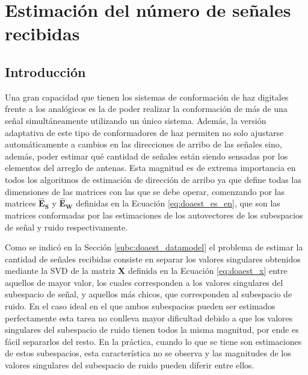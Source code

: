 \chapter{Estimación del número de señales recibidas}\label{ch:machinelearning}

\section{Introducción}\label{subc:intro_congen}
Una gran capacidad que tienen los sistemas de conformación de haz digitales frente a los analógicos es la de poder realizar la conformación de más de una señal simultáneamente utilizando un único sistema. Además, la versión adaptativa de este tipo de conformadores de haz permiten no solo ajustarse automáticamente a cambios en las direcciones de arribo de las señales sino, además, poder estimar qué cantidad de señales están siendo sensadas por los elementos del arreglo de antenas. Esta magnitud es de extrema importancia en todos los algoritmos de estimación de dirección de arribo ya que define todas las dimensiones de las matrices con las que se debe operar, comenzando por las matrices $\mathbf{\hat{E}_S}$ y $\mathbf{\hat{E}_W}$ definidas en la Ecuación \ref{eq:doaest_es_en}, que son las matrices conformadas por las estimaciones de los autovectores de los subespacios de señal y ruido respectivamente.

Como se indicó en la Sección \ref{subc:doaest_datamodel} el problema de estimar la cantidad de señales recibidas consiste en separar los valores singulares obtenidos mediante la SVD de la matriz $\mathbf{X}$ definida en la Ecuación \ref{eq:doaest_x} entre aquellos de mayor valor, los cuales corresponden a los valores singulares del subespacio de señal, y aquellos más chicos, que corresponden al subespacio de ruido. En el caso ideal en el que ambos subespacios pueden ser estimados perfectamente esta tarea no conlleva mayor dificultad debido a que los valores singulares del subespacio de ruido tienen todos la misma magnitud, por ende es fácil separarlos del resto. En la práctica, cuando lo que se tiene son estimaciones de estos subespacios, esta característica no se observa y las magnitudes de los valores singulares del subespacio de ruido pueden diferir entre ellos.

